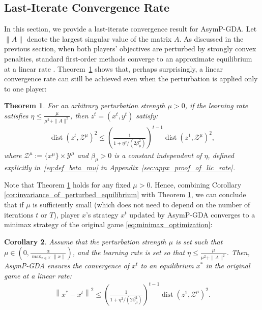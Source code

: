 \documentclass{article}
\DeclareMathOperator{\dist}{dist}
\newcommand{\X}{\mathcal{X}}
\newcommand{\Y}{\mathcal{Y}}
\newcommand{\Z}{\mathcal{Z}}
\theoremstyle{plain}
\newtheorem{theorem}{Theorem}[section]
\newtheorem{corollary}[theorem]{Corollary}
\begin{document}
\subsection{Last-Iterate Convergence Rate}
In this section, we provide a last-iterate convergence result for AsymP-GDA.
Let $\|A\|$ denote the largest singular value of the matrix $A$.
As discussed in the previous section, when both players' objectives are perturbed by strongly convex penalties, standard first-order methods converge to an approximate equilibrium at a linear rate \citep{cen2021fast,cen2022faster,pmlr-v206-pattathil23a,sokota2022unified}.
Theorem~\ref{thm:lic_rate} shows that, perhaps surprisingly, a linear convergence rate can still be achieved even when the perturbation is applied only to one player:
\begin{theorem}
    \label{thm:lic_rate}
    For an arbitrary perturbation strength $\mu > 0$, if the learning rate satisfies $\eta \leq \frac{\mu}{\mu^2 + \|A\|^2}$, then $z^t = (x^t, y^t)$ satisfy:
    \begin{align*}
        \dist(z^t, \Z^{\mu})^2 \leq \left(\frac{1}{1 + \eta^2 / (2\beta_{\mu}^2)}\right)^{t-1} \dist(z^1, \Z^{\mu})^2,
    \end{align*}
    where $\Z^{\mu} := \{x^{\mu}\} \times \Y^{\mu}$ and $\beta_{\mu} > 0$ is a constant independent of $\eta$, defined explicitly in~\eqref{eq:def_beta_mu} in Appendix~\ref{sec:appx_proof_of_lic_rate}.
\end{theorem}

Note that Theorem \ref{thm:lic_rate} holds for any fixed $\mu > 0$.
Hence, combining Corollary \ref{cor:invariance_of_perturbed_equilibrium} with Theorem \ref{thm:lic_rate}, we can conclude that if $\mu$ is sufficiently small (which does not need to depend on the number of iterations $t$ or $T$), player $x$'s strategy $x^t$ updated by AsymP-GDA converges to a minimax strategy of the original game \eqref{eq:minimax_optimization}:

\begin{corollary}
    \label{cor:lic_rate}
    Assume that the perturbation strength $\mu$ is set such that $\mu\in (0, \frac{\alpha}{\max_{x\in \X}\left\|x\right\|})$, and the learning rate is set so that $\eta \leq \frac{\mu}{\mu^2 + \|A\|^2}$.
    Then, AsymP-GDA ensures the convergence of $x^t$ to an equilibrium $x^{\ast}$ in the original game at a linear rate:
    \begin{align*}
        \left\|x^{\ast} - x^t\right\|^2 \leq \left(\frac{1}{1 + \eta^2 / (2\beta_{\mu}^2)}\right)^{t-1} \dist(z^1, \Z^{\mu})^2.
    \end{align*}
\end{corollary}
\end{document}
